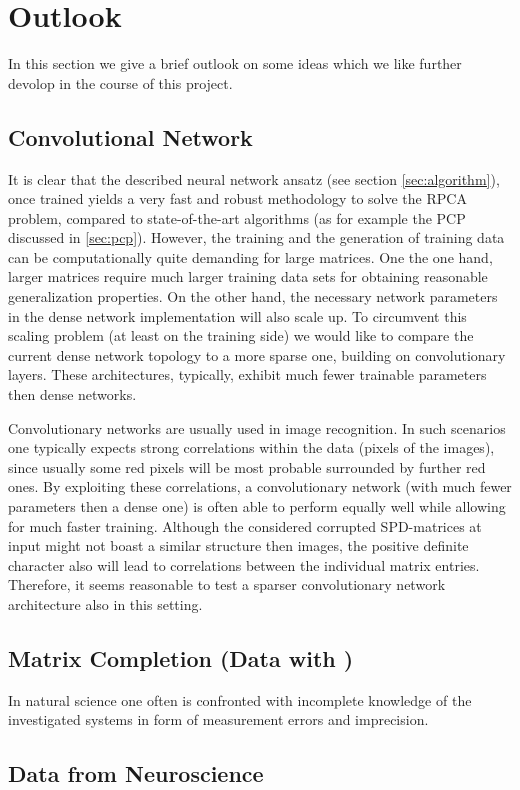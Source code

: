 \newpage
\section{Outlook}\label{sec:outlook}

In this section we give a brief outlook on some ideas which we like further devolop in the course of this project.


\subsection{Convolutional Network}
It is clear that the described neural network ansatz (see section \ref{sec:algorithm}), once trained yields a very fast and robust methodology to solve the RPCA problem, compared to state-of-the-art algorithms (as for example the PCP discussed in \ref{sec:pcp}). However, the training and the generation of training data can be computationally quite demanding for large matrices. One the one hand, larger matrices require much larger training data sets for obtaining reasonable generalization properties. On the other hand, the necessary network parameters in the dense network implementation will also scale up. To circumvent this scaling problem (at least on the training side) we would like to compare the current dense network topology to a more sparse one, building on convolutionary layers. These architectures, typically, exhibit much fewer trainable parameters then dense networks.

Convolutionary networks are usually used in image recognition. In such scenarios one typically expects strong correlations within the data (pixels of the images), since usually some red pixels will be most probable surrounded by further red ones. By exploiting these correlations, a convolutionary network (with much fewer parameters then a dense one) is often able to perform equally well while allowing for much faster training. Although the considered corrupted SPD-matrices at input might not boast a similar structure then images, the positive definite character also will lead to correlations between the individual matrix entries. Therefore, it seems reasonable to test a sparser convolutionary network architecture also in this setting.



\subsection{Matrix Completion (Data with )}
In natural science one often is confronted with incomplete knowledge of the investigated systems in form of measurement errors and imprecision.

\subsection{Data from Neuroscience}

